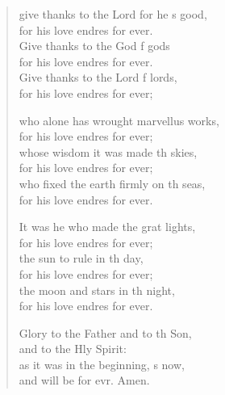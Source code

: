 \begin{verse}
  \begin{patverse}
 give thanks to the Lord for he \pointup{\i}s good,\Med\\
    for his love endres for ever.\\
Give thanks to the God f gods\Med\\
    for his love endres for ever.\\
Give thanks to the Lord f lords,\Med\\
    for his love endres for ever;

who alone has wrought marvellus works,\Med\\
    for his love endres for ever;\\
whose wisdom it was made th skies,\Med\\
    for his love endres for ever;\\
who fixed the earth firmly on th seas,\Med\\
    for his love endres for ever.

It was he who made the grat lights,\Med\\
    for his love endres for ever;\\
the sun to rule in th day,\Med\\
    for his love endres for ever;\\
the moon and stars in th night,\Med\\
    for his love endres for ever.

Glory to the Father and to th Son,\Med\\
    and to the Hly Spirit:\\
as it was in the beginning, \pointup{\i}s now,\Med\\
    and will be for evr. Amen.
  \end{patverse}
\end{verse}

